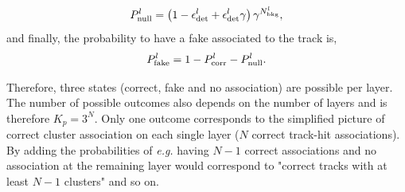 \begin{equation}
  P^{l}_{\rm null} = \left(1 - \epsilon^l_{\rm det} + \epsilon^l_{\rm det}\gamma \right)  \gamma^{N^l_{\rm bkg}},
\end{equation}
\noindent
and finally, the probability to have a fake associated to the track is,
\begin{equation}
  P^{l}_{\rm fake} = 1 - P^l_{\rm corr} - P^l_{\rm null}.
\end{equation}


Therefore, three states (correct, fake and no association) are possible per layer. The number of possible outcomes also depends on the number of layers and is therefore $K_p =3^N$. 
Only one outcome corresponds to the simplified picture of correct cluster association on each single layer ($N$ correct track-hit associations). By adding the probabilities of {\it e.g.} 
having $N - 1$ correct associations and no association at the remaining layer would correspond to "correct tracks with at least $N - 1$ clusters" and so on.


